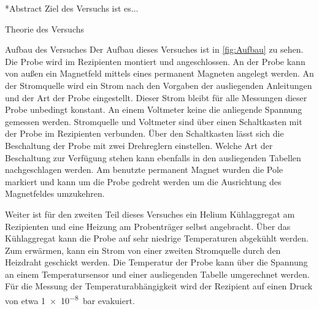 \documentclass[pdftex, a4paper,11pt, twoside, ngerman]{report}
\begin{document}
  
  
  
  
  
  
  
  
  \begin{chapter}*{Abstract}
    Ziel des Versuchs ist es...
    
    
  \end{chapter}
  
  \tableofcontents
  
  
  
  \begin{chapter}{Theorie des Versuchs}
    \label{chp:Theorie}
    
    
    
  \end{chapter}
         
         
         
  \begin{chapter}{Aufbau des Versuches}
    \label{chp:Aufbau}
    Der Aufbau dieses Versuches ist in \cref{fig:Aufbau} zu sehen.
    Die Probe wird im Rezipienten montiert und angeschlossen.
    An der Probe kann von außen ein Magnetfeld mittels eines permanent Magneten
    angelegt werden. An der Stromquelle wird ein Strom nach den Vorgaben der
    ausliegenden Anleitungen und der Art der Probe eingestellt.
    Dieser Strom bleibt für alle Messungen dieser Probe unbedingt konstant.
    An einem Voltmeter keine die anliegende Spannung gemessen werden.
    Stromquelle und Voltmeter sind über einen Schaltkasten mit der Probe im
    Rezipienten verbunden.
    Über den Schaltkasten lässt sich die Beschaltung der Probe mit zwei
    Drehreglern einstellen.
    Welche Art der Beschaltung zur Verfügung stehen kann ebenfalls in den
    ausliegenden Tabellen nachgeschlagen werden.
    Am benutzte permanent Magnet wurden die Pole markiert und kann um die Probe
    gedreht werden um die Ausrichtung des Magnetfeldes umzukehren.
    
    Weiter ist für den zweiten Teil dieses Versuches ein Helium Kühlaggregat am
    Rezipienten und eine Heizung am Probenträger selbst angebracht.
    Über das Kühlaggregat kann die Probe auf sehr niedrige Temperaturen
    abgekühlt werden. Zum erwärmen, kann ein Strom von einer zweiten Stromquelle
    durch den Heizdraht geschickt werden. Die Temperatur der Probe kann über
    die Spannung an einem Temperatursensor und einer ausliegenden
    Tabelle umgerechnet werden.
    Für die Messung der Temperaturabhängigkeit wird der Rezipient auf einen
    Druck von etwa \SI{1e-8}{\bar} evakuiert.
    
    
  \end{chapter}
  
\end{document}
